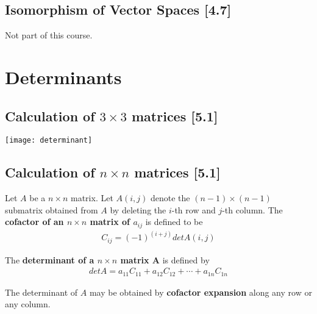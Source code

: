 \documentclass[a4paper,9pt]{extarticle}
\begin{document}
\begin{multicols*}{2}

\subsection{Isomorphism of Vector Spaces [4.7]}
Not part of this course.




\section{Determinants}


\subsection{Calculation of $3 \times 3$ matrices [5.1]}
{\centering \texttt{[image: determinant]} \par}


\subsection{Calculation of $n \times n$ matrices [5.1]}
Let $A$ be a $n \times n$ matrix. Let $A(i,j)$ denote the $(n - 1) \times (n - 1)$ submatrix obtained from $A$ by deleting the $i$-th row and $j$-th column. The \textbf{cofactor of an $n \times n$ matrix of $a_{ij}$} is defined to be
\begin{equation} \label{5.1-1}
    \begin{split}
        C_{ij} = (-1)^{(i + j)} det A(i, j)
    \end{split}
\end{equation}

The \textbf{determinant of a $n \times n$ matrix A} is defined by
\begin{equation} \label{5.1-2}
    \begin{split}
        det A = a_{11} C_{11} + a_{12} C_{12} + \cdots + a_{1n} C_{1n}
    \end{split}
\end{equation}

The determinant of $A$ may be obtained by \textbf{cofactor expansion} along any row or any column.


\end{multicols*}
\end{document}
